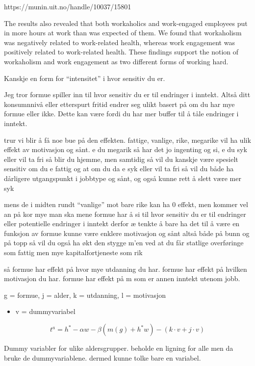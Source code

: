 \documentclass[
  12pt,
  a4paper,
  DIV=11,
  numbers=noendperiod]{scrartcl}
\providecommand{\tightlist}{%
  \setlength{\itemsep}{0pt}\setlength{\parskip}{0pt}}\usepackage{longtable,booktabs,array}
\begin{document}
https://munin.uit.no/handle/10037/15801

The results also revealed that both workaholics and work-engaged
employees put in more hours at work than was expected of them. We found
that workaholism was negatively related to work-related health, whereas
work engagement was positively related to work-related health. These
findings support the notion of workaholism and work engagement as two
different forms of working hard.

Kanskje en form for ``intensitet'' i hvor sensitiv du er.

Jeg tror formue spiller inn til hvor sensitiv du er til endringer i
inntekt. Altså ditt konsumnnivå eller etterspurt fritid endrer seg ulikt
basert på om du har mye formue eller ikke. Dette kan være fordi du har
mer buffer til å tåle endringer i inntekt.

trur vi blir å få noe bue på den effekten. fattige, vanlige, rike,
megarike vil ha ulik effekt av motivasjon og sånt. e du megarik så har
det jo ingenting og si, e du syk eller vil ta fri så blir du hjemme, men
samtidig så vil du kanskje være spesielt sensitiv om du e fattig og at
om du da e syk eller vil ta fri så vil du både ha dårligere utgangspunkt
i jobbtype og sånt, og også kunne rett å slett være mer syk

mens de i midten rundt ``vanlige'' mot bare rike kan ha 0 effekt, men
kommer vel an på kor mye man ska mene formue har å si til hvor sensitiv
du er til endringer eller potentielle endringer i inntekt derfor æ
tenkte å bare ha det til å være en funksjon av formue kunne være enklere
motivasjon og sånt altså både på bunn og på topp så vil du også ha økt
den stygge m'en ved at du får statlige overføringe som fattig men mye
kapitalfortjeneste som rik

så formue har effekt på hvor mye utdanning du har. formue har effekt på
hvilken motivasjon du har. formue har effekt på m som er annen inntekt
utenom jobb.

g = formue, j = alder, k = utdanning, l = motivasjon

\begin{itemize}
\tightlist
\item
  v = dummyvariabel
\end{itemize}

\[
t^a = h^* - \alpha w - \beta(m(g) + h^*w) - (k\cdot v+j\cdot v)
\]

Dummy variabler for ulike aldersgrupper. beholde en ligning for alle men
da bruke de dummyvariablene. dermed kunne tolke bare en variabel.
\end{document}
